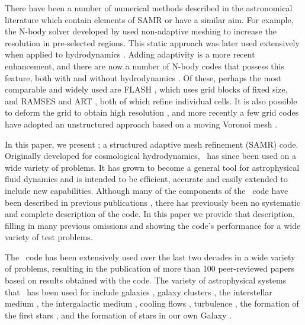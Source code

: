 There have been a number of numerical methods described in the astronomical literature which contain elements of SAMR or have a similar aim. For example, the N-body solver developed by \citet{Villumsen89} used non-adaptive meshing to increase the resolution in pre-selected regions. This static approach was later used extensively when applied to hydrodynamics \citep[e.g.,][]{Ruffert94, Anninos94}. Adding adaptivity is a more recent enhancement, and there are now a number of N-body codes that possess this feature, both with and without  hydrodynamics  \citep{Couchman91, Jessop94, Suisalu95, Splinter96, Gelato97, ART97, Truelove98, flash_method, MLAPM01,  Yahagi01, RAMSES, Quilis04, Ziegler05, Zhang06, Astrobear09, Pluto-amr, GAMER, Nyx}. Of these, perhaps the most comparable and widely used are FLASH \citep{flash_method}, which uses grid blocks of fixed size, and RAMSES \citep{RAMSES} and ART \citep{ART97}, both of which refine individual cells. It is also possible to deform the grid to obtain high resolution \citep[e.g.,][]{Gnedin95, Xu97, Pen98}, and more recently a few grid codes have adopted an unstructured approach based on a moving Voronoi mesh \citep{Arepo10, Tess11}.

In this paper, we present \enzo; a structured adaptive mesh refinement (SAMR) code. Originally developed for cosmological hydrodynamics, \enzo\ has since been used on a wide variety of problems.  It has grown to become a general tool for astrophysical fluid dynamics and is intended to be efficient, accurate and easily extended to include new capabilities.  Although many of the components of the \enzo\ code have been described in previous publications \citep{1995CoPhC..89..149B, BryanThesis96, Bryan97a, Bryan97b, Norman99, BryanCompSci99, Bryan01, Oshea04, 2007arXiv0705.1556N, WangAbelZhang08,ReynoldsHayesPaschosNorman2009,Collins10,Wise11_Moray}, there has previously been no systematic and complete description of the code.  In this paper we provide that description, filling in many previous omissions and showing the code's performance for a wide variety of test problems.

The \enzo\ code has been extensively used over the last two decades in a wide variety of problems, resulting in the publication of more than 100 peer-reviewed papers based on results obtained with the code. The variety of astrophysical systems that \enzo\ has been used for include galaxies \citep{2003ApJ...587...13T, 2012ApJ...749..140H}, galaxy clusters \citep{Loken02, Skillman13}, the interstellar medium \citep{Slyz05}, the intergalactic medium \citep{Fang01, 2011ApJ...731....6S}, cooling flows \citep{Li12, 2013ApJ...763...38S}, turbulence \citep{Kritsuk04, 2009JPhCS.180a2020K, Collins11}, the formation of the first stars \citep{ABN02, 2007ApJ...654...66O, 2009Sci...325..601T}, and the formation of stars in our own Galaxy \citep{Collins12a}.

